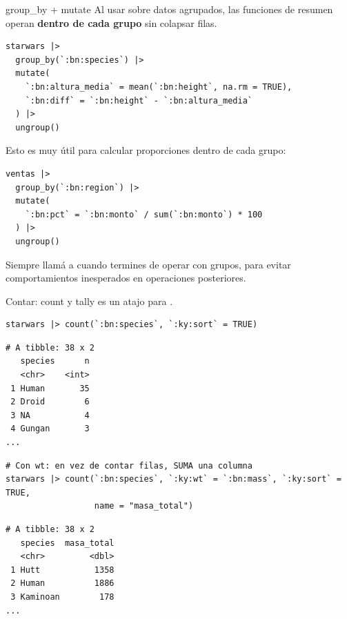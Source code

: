 \documentclass[8pt]{beamer}
\begin{document}
\begin{frame}[fragile]{group\_by + mutate}
	Al usar  sobre datos agrupados, las funciones de resumen operan \textbf{dentro de cada grupo} sin colapsar filas.
\begin{lstlisting}[style=RScript]
starwars |>
  group_by(`:bn:species`) |>
  mutate(
    `:bn:altura_media` = mean(`:bn:height`, na.rm = TRUE),
    `:bn:diff` = `:bn:height` - `:bn:altura_media`
  ) |>
  ungroup()
\end{lstlisting}

	Esto es muy útil para calcular proporciones dentro de cada grupo:
\begin{lstlisting}[style=RScript]
ventas |>
  group_by(`:bn:region`) |>
  mutate(
    `:bn:pct` = `:bn:monto` / sum(`:bn:monto`) * 100
  ) |>
  ungroup()
\end{lstlisting}

	\begin{alertblock}{}
		Siempre llamá a  cuando termines de operar con grupos, para evitar comportamientos inesperados en operaciones posteriores.
	\end{alertblock}
\end{frame}




\begin{frame}[fragile]{Contar: count y tally}
	 es un atajo para .
\begin{lstlisting}[style=RScript]
starwars |> count(`:bn:species`, `:ky:sort` = TRUE)
\end{lstlisting}
\begin{lstlisting}[style=RConsole]
# A tibble: 38 x 2
   species      n
   <chr>    <int>
 1 Human       35
 2 Droid        6
 3 NA           4
 4 Gungan       3
...
\end{lstlisting}
\begin{lstlisting}[style=RScript]
# Con wt: en vez de contar filas, SUMA una columna
starwars |> count(`:bn:species`, `:ky:wt` = `:bn:mass`, `:ky:sort` = TRUE,
                  name = "masa_total")
\end{lstlisting}
\begin{lstlisting}[style=RConsole]
# A tibble: 38 x 2
   species  masa_total
   <chr>         <dbl>
 1 Hutt           1358
 2 Human          1886
 3 Kaminoan        178
...
\end{lstlisting}
\end{frame}
\end{document}
